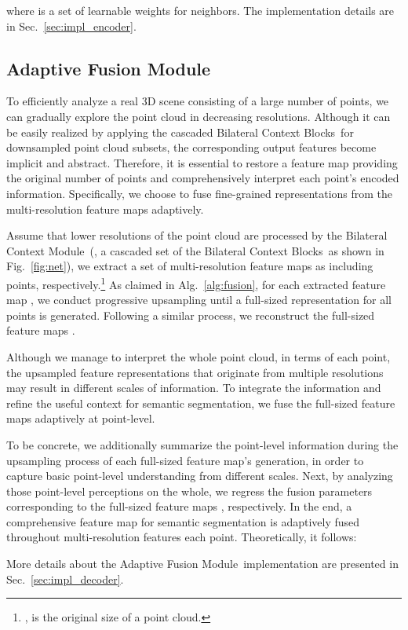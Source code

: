 \documentclass[10pt,twocolumn,letterpaper]{article}
\def\ourencoder{Bilateral Context Module}
\def\ourblocks{Bilateral Context Blocks}
\def\ourdecoder{Adaptive Fusion Module}
\begin{document}
where  is a set of learnable weights for  neighbors. The implementation details are in Sec.~\ref{sec:impl_encoder}.

\subsection{Adaptive Fusion Module}
\label{sec:metho_fuse}
To efficiently analyze a real 3D scene consisting of a large number of points, we can gradually explore the point cloud in decreasing resolutions. Although it can be easily realized by applying the cascaded \ourblocks~for downsampled point cloud subsets, the corresponding output features become implicit and abstract. Therefore, it is essential to restore a feature map providing the original number of points and comprehensively interpret each point's encoded information. Specifically, we choose to fuse fine-grained representations from the multi-resolution feature maps adaptively.

Assume that  lower resolutions of the point cloud are processed by the \ourencoder~(\ie, a cascaded set of the \ourblocks~as shown in Fig.~\ref{fig:net}), we extract a set of multi-resolution feature maps as  including  points, respectively.\footnote{,  is the original size of a point cloud.} As claimed in Alg.~\ref{alg:fusion}, for each extracted feature map , we conduct progressive upsampling until a full-sized representation for all  points is generated. Following a similar process, we reconstruct the full-sized feature maps .

Although we manage to interpret the whole point cloud, in terms of each point, the upsampled feature representations that originate from multiple resolutions may result in different scales of information. To integrate the information and refine the useful context for semantic segmentation, we fuse the full-sized feature maps adaptively at point-level.

To be concrete, we additionally summarize the point-level information  during the upsampling process of each full-sized feature map's generation, in order to capture basic point-level understanding from different scales. Next, by analyzing those point-level perceptions  on the whole, we regress the fusion parameters  corresponding to the full-sized feature maps , respectively. In the end, a comprehensive feature map  for semantic segmentation is adaptively fused throughout multi-resolution features \wrt each point. Theoretically, it follows:

More details about the \ourdecoder~implementation are presented in Sec.~\ref{sec:impl_decoder}. 
\end{document}
